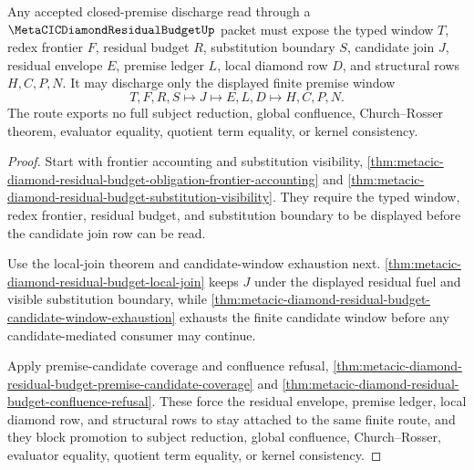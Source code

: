 \begin{theorem}
\label{thm:metacic-diamond-residual-budget-closed-premise-discharge-route}
Any accepted closed-premise discharge read through a $\MetaCICDiamondResidualBudgetUp$ packet must expose the typed window $T$, redex frontier $F$, residual budget $R$, substitution boundary $S$, candidate join $J$, residual envelope $E$, premise ledger $L$, local diamond row $D$, and structural rows $H,C,P,N$. It may discharge only the displayed finite premise window
$$
T,F,R,S \longmapsto J \longmapsto E,L,D \longmapsto H,C,P,N .
$$
The route exports no full subject reduction, global confluence, Church--Rosser theorem, evaluator equality, quotient term equality, or kernel consistency.
\end{theorem}
\begin{proof}
Start with frontier accounting and substitution visibility, \autoref{thm:metacic-diamond-residual-budget-obligation-frontier-accounting} and \autoref{thm:metacic-diamond-residual-budget-substitution-visibility}. They require the typed window, redex frontier, residual budget, and substitution boundary to be displayed before the candidate join row can be read.

Use the local-join theorem and candidate-window exhaustion next. \autoref{thm:metacic-diamond-residual-budget-local-join} keeps $J$ under the displayed residual fuel and visible substitution boundary, while \autoref{thm:metacic-diamond-residual-budget-candidate-window-exhaustion} exhausts the finite candidate window before any candidate-mediated consumer may continue.

Apply premise-candidate coverage and confluence refusal, \autoref{thm:metacic-diamond-residual-budget-premise-candidate-coverage} and \autoref{thm:metacic-diamond-residual-budget-confluence-refusal}. These force the residual envelope, premise ledger, local diamond row, and structural rows to stay attached to the same finite route, and they block promotion to subject reduction, global confluence, Church--Rosser, evaluator equality, quotient term equality, or kernel consistency.
\end{proof}

